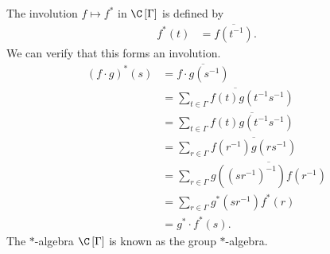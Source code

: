 \documentclass[10pt]{mypackage}
\begin{document}
The involution $f\mapsto f^{\ast}$ in $\C\left[\Gamma\right]$ is defined by
\begin{align*}
  f^{\ast}\left(t\right) &= \overline{f\left(t^{-1}\right)}.
\end{align*}
We can verify that this forms an involution.
\begin{align*}
  \left(f\cdot g\right)^{\ast}\left(s\right) &= \overline{f\cdot g\left(s^{-1}\right)}\\
                                             &= \overline{\sum_{t\in \Gamma}f\left(t\right)g\left(t^{-1}s^{-1}\right)}\\
                                             &= \sum_{t\in \Gamma}\overline{f\left(t\right)g\left(t^{-1}s^{-1}\right)}\\
                                             &= \sum_{r\in \Gamma}\overline{f\left(r^{-1}\right)g\left(rs^{-1}\right)}\\
                                             &= \sum_{r\in \Gamma}\overline{g\left(\left(sr^{-1}\right)^{-1}\right)f\left(r^{-1}\right)}\\
                                             &= \sum_{r\in \Gamma}g^{\ast}\left(sr^{-1}\right)f^{\ast}\left(r\right)\\
                                             &= g^{\ast}\cdot f^{\ast}\left(s\right).
\end{align*}
The $\ast$-algebra $\C\left[\Gamma\right]$ is known as the group $\ast$-algebra.
\end{document}
